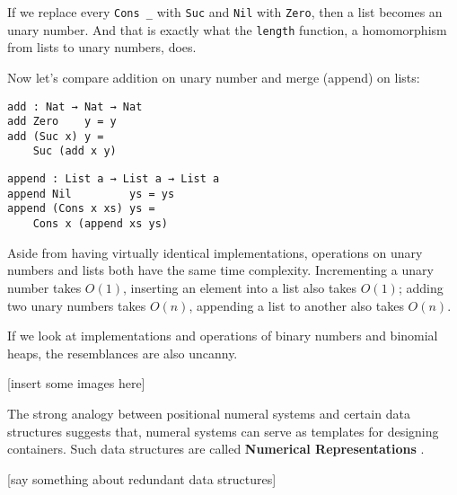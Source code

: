 \documentclass[12pt, a4paper]{article}
\begin{document}
If we replace every {\lstinline|Cons _|} with {\lstinline|Suc|} and {\lstinline|Nil|}
with {\lstinline|Zero|}, then a list becomes an unary number.
And that is exactly what the {\lstinline|length|} function,
a homomorphism from lists to unary numbers, does.

Now let's compare addition on unary number and merge (append) on lists:

\noindent\begin{minipage}{.48\textwidth}
\begin{lstlisting}[basicstyle=\ttfamily\scriptsize]
add : Nat → Nat → Nat
add Zero    y = y
add (Suc x) y =
    Suc (add x y)
\end{lstlisting}
\end{minipage}\hfill
\begin{minipage}{.45\textwidth}
\begin{lstlisting}[basicstyle=\ttfamily\scriptsize]
append : List a → List a → List a
append Nil         ys = ys
append (Cons x xs) ys =
    Cons x (append xs ys)
\end{lstlisting}
\end{minipage}

Aside from having virtually identical implementations, operations on unary numbers
and lists both have the same time complexity. Incrementing a unary number takes
$ O(1) $, inserting an element into a list also takes $ O(1) $; adding two unary
numbers takes $ O(n) $, appending a list to another also takes $ O(n) $.

If we look at implementations and operations of binary numbers and binomial
heaps, the resemblances are also uncanny.

[insert some images here]

The strong analogy between positional numeral systems and certain data structures
suggests that, numeral systems can serve as templates for designing containers.
Such data structures are called \textbf{Numerical Representations}\cite{okasaki1996purely}
\cite{hinze1998numerical}.

[say something about redundant data structures]


\end{document}
